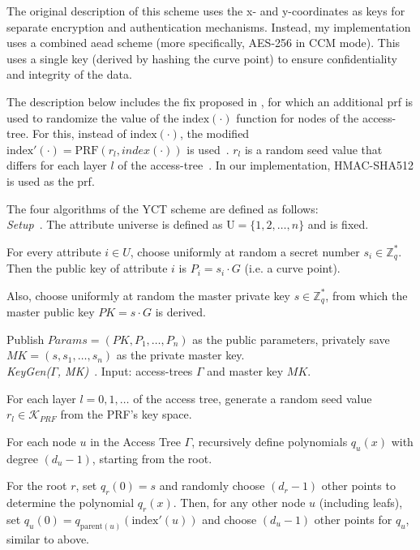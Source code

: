 The original description of this scheme uses the x- and y-coordinates as keys for separate encryption and authentication mechanisms.
Instead, my implementation uses a combined \acrshort{aead} scheme (more specifically, AES-256 in CCM mode).
This uses a single key (derived by hashing the curve point) to ensure confidentiality and integrity of the data.

The description below includes the fix proposed in \cite{tan_enhancement_2019}, for which an additional \acrshort{prf} is used to randomize the value of the $\text{index}(\cdot)$ function for nodes of the \gls{access-tree}.
For this, instead of $\text{index}(\cdot)$, the modified $\text{index}'(\cdot) = \text{PRF}(r_l, index(\cdot))$ is used~\cite{tan_enhancement_2019}.
$r_l$ is a random seed value that differs for each layer $l$ of the \gls{access-tree}~\cite{tan_enhancement_2019}.
In our implementation, HMAC-SHA512 is used as the \acrshort{prf}.

The four algorithms of the YCT scheme are defined as follows: \\

\emph{Setup}~\cite{yao_lightweight_2015}.
The attribute universe is defined as $\text{U} = \{1, 2, \dots, n\}$ and is fixed.

For every attribute $i \in U$, choose uniformly at random a secret number $s_i \in \mathbb{Z}_q^*$. %
Then the public key of attribute $i$ is $P_i = s_i \cdot G$ (i.e. a curve point).

Also, choose uniformly at random the master private key $s \in \mathbb{Z}_q^*$, from which the master public key $PK = s \cdot G$ is derived.

Publish $Params=(PK, P_1, \dots, P_n)$ as the public parameters, privately save $MK = (s, s_1, \dots, s_n)$ as the private master key.
\\

\emph{KeyGen($\Gamma$, MK)}~\cite{yao_lightweight_2015}.
Input: \glspl{access-tree} $\Gamma$ and master key $MK$.

For each layer $l = 0, 1, \dots$ of the access tree, generate a random seed value $r_l \in \mathcal{K}_{PRF}$ from the PRF's key space.

For each node $u$ in the Access Tree $\Gamma$, recursively define polynomials $q_u(x)$ with degree $(d_u - 1)$, starting from the root.

For the root $r$, set $q_r(0) = s$ and randomly choose $(d_r - 1)$ other points to determine the polynomial $q_r(x)$.
Then, for any other node $u$ (including leafs), set $q_u(0) = q_{\text{parent}(u)}(\text{index}'(u))$ and choose $(d_u -1)$ other points for $q_u$, similar to above.

